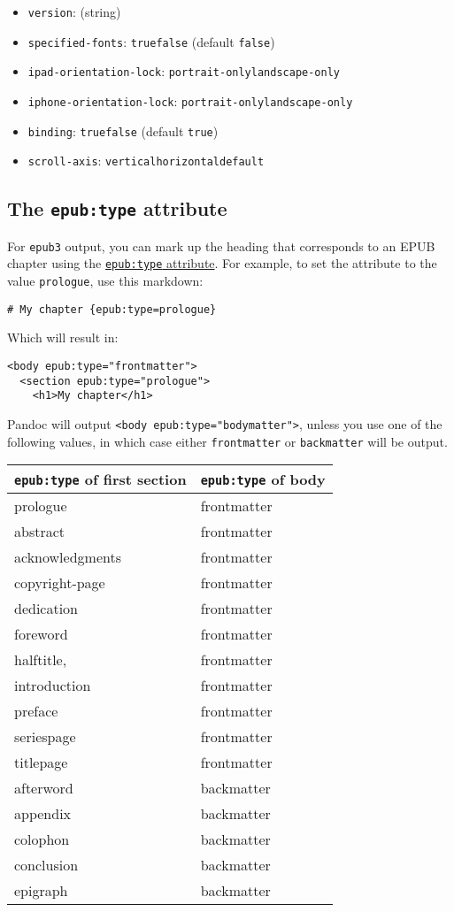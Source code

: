\documentclass[
]{article}
\providecommand{\tightlist}{%
  \setlength{\itemsep}{0pt}\setlength{\parskip}{0pt}}
\begin{document}
\begin{description}
\begin{itemize}
\tightlist
\item
  \texttt{version}: (string)
\item
  \texttt{specified-fonts}: \texttt{true}\textbar{}\texttt{false}
  (default \texttt{false})
\item
  \texttt{ipad-orientation-lock}:
  \texttt{portrait-only}\textbar{}\texttt{landscape-only}
\item
  \texttt{iphone-orientation-lock}:
  \texttt{portrait-only}\textbar{}\texttt{landscape-only}
\item
  \texttt{binding}: \texttt{true}\textbar{}\texttt{false} (default
  \texttt{true})
\item
  \texttt{scroll-axis}:
  \texttt{vertical}\textbar{}\texttt{horizontal}\textbar{}\texttt{default}
\end{itemize}
\end{description}

\hypertarget{the-epubtype-attribute}{%
\subsection{\texorpdfstring{The \texttt{epub:type}
attribute}{The epub:type attribute}}\label{the-epubtype-attribute}}

For \texttt{epub3} output, you can mark up the heading that corresponds
to an EPUB chapter using the
\href{http://www.idpf.org/epub/31/spec/epub-contentdocs.html\#sec-epub-type-attribute}{\texttt{epub:type}
attribute}. For example, to set the attribute to the value
\texttt{prologue}, use this markdown:

\begin{verbatim}
# My chapter {epub:type=prologue}
\end{verbatim}

Which will result in:

\begin{verbatim}
<body epub:type="frontmatter">
  <section epub:type="prologue">
    <h1>My chapter</h1>
\end{verbatim}

Pandoc will output
\texttt{\textless{}body\ epub:type="bodymatter"\textgreater{}}, unless
you use one of the following values, in which case either
\texttt{frontmatter} or \texttt{backmatter} will be output.

\begin{longtable}[]{@{}ll@{}}
\toprule
\texttt{epub:type} of first section & \texttt{epub:type} of
body\tabularnewline
\midrule
\endhead
prologue & frontmatter\tabularnewline
abstract & frontmatter\tabularnewline
acknowledgments & frontmatter\tabularnewline
copyright-page & frontmatter\tabularnewline
dedication & frontmatter\tabularnewline
foreword & frontmatter\tabularnewline
halftitle, & frontmatter\tabularnewline
introduction & frontmatter\tabularnewline
preface & frontmatter\tabularnewline
seriespage & frontmatter\tabularnewline
titlepage & frontmatter\tabularnewline
afterword & backmatter\tabularnewline
appendix & backmatter\tabularnewline
colophon & backmatter\tabularnewline
conclusion & backmatter\tabularnewline
epigraph & backmatter\tabularnewline
\bottomrule
\end{longtable}
\end{document}
